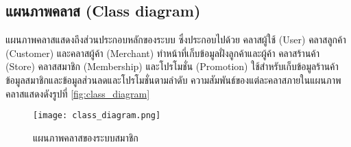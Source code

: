 \documentclass[12pt,a4paper]{article}
\begin{document}
\subsection{แผนภาพคลาส (Class diagram)}
แผนภาพคลาสแสดงถึงส่วนประกอบหลักของระบบ ซึ่งประกอบไปด้วย คลาสผู้ใช้ (User) คลาสลูกค้า (Customer) และคลาสผู้ค้า (Merchant) ทำหน้าที่เก็บข้อมูลฝั่งลูกค้าและผู้ค้า คลาสร้านค้า (Store) คลาสสมาชิก (Membership) และโปรโมชั่น (Promotion) ใช้สำหรับเก็บข้อมูลร้านค้า ข้อมูลสมาชิกและข้อมูลส่วนลดและโปรโมชั่นตามลำดับ ความสัมพันธ์ของแต่ละคลาสภายในแผนภาพคลาสแสดงดังรูปที่ \ref{fig:class_diagram}

\begin{figure}[ht!]
\centering
\texttt{[image: class\_diagram.png]}
\caption{แผนภาพคลาสของระบบสมาชิก} \label{fig:class_diagram}
\label{overflow}
\end{figure}





\end{document}
